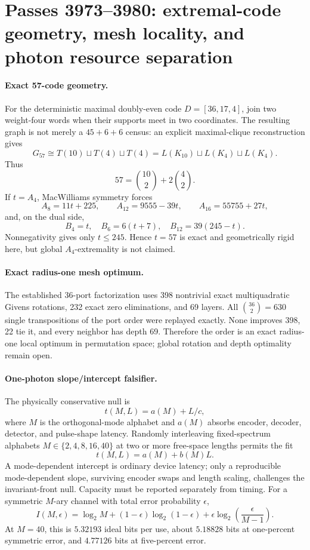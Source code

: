 \section*{Passes 3973--3980: extremal-code geometry, mesh locality, and photon resource separation}

\paragraph{Exact 57-code geometry.}
For the deterministic maximal doubly-even code $D=[36,17,4]$, join two weight-four words when their supports meet in two coordinates.  The resulting graph is not merely a $45+6+6$ census: an explicit maximal-clique reconstruction gives
\[
  \boxed{G_{57}\cong T(10)\sqcup T(4)\sqcup T(4)
  =L(K_{10})\sqcup L(K_4)\sqcup L(K_4).}
\]
Thus
\[
  57=\binom{10}{2}+2\binom{4}{2}.
\]
If $t=A_4$, MacWilliams symmetry forces
\[
 A_8=11t+225,\qquad A_{12}=9555-39t,\qquad A_{16}=55755+27t,
\]
and, on the dual side,
\[
 B_4=t,\quad B_6=6(t+7),\quad B_{12}=39(245-t).
\]
Nonnegativity gives only $t\le245$.  Hence $t=57$ is exact and geometrically rigid here, but global $A_4$-extremality is not claimed.

\paragraph{Exact radius-one mesh optimum.}
The established 36-port factorization uses 398 nontrivial exact multiquadratic Givens rotations, 232 exact zero eliminations, and 69 layers.  All $\binom{36}{2}=630$ single transpositions of the port order were replayed exactly.  None improves 398, 22 tie it, and every neighbor has depth 69.  Therefore the order is an exact radius-one local optimum in permutation space; global rotation and depth optimality remain open.

\paragraph{One-photon slope/intercept falsifier.}
The physically conservative null is
\[
  t(M,L)=a(M)+L/c,
\]
where $M$ is the orthogonal-mode alphabet and $a(M)$ absorbs encoder, decoder, detector, and pulse-shape latency.  Randomly interleaving fixed-spectrum alphabets $M\in\{2,4,8,16,40\}$ at two or more free-space lengths permits the fit
\[
  t(M,L)=a(M)+b(M)L.
\]
A mode-dependent intercept is ordinary device latency; only a reproducible mode-dependent slope, surviving encoder swaps and length scaling, challenges the invariant-front null.  Capacity must be reported separately from timing.  For a symmetric $M$-ary channel with total error probability $\epsilon$,
\[
 I(M,\epsilon)=\log_2M+(1-\epsilon)\log_2(1-\epsilon)
 +\epsilon\log_2\!\left(\frac{\epsilon}{M-1}\right).
\]
At $M=40$, this is $5.32193$ ideal bits per use, about $5.18828$ bits at one-percent symmetric error, and $4.77126$ bits at five-percent error.

